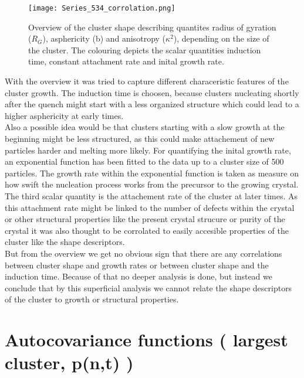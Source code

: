 \begin{figure}[!h]
\centering
\texttt{[image: Series\_534\_corrolation.png]}
\caption{Overview of the cluster shape describing quantites radius of gyration ($R_G$), asphericity (b) and anisotropy ($\kappa^2$), depending on the size of the cluster. The colouring depicts the scalar quantities induction time, constant attachment rate and inital growth rate.}
\label{fig:tog_overview}
\end{figure}

With the overview it was tried to capture different characeristic features of the cluster growth. The induction time is choosen, because clusters nucleating shortly after the quench might start with a  less organized structure which could lead to a higher asphericity at early times.\\ 

Also a possible idea would be that clusters starting with a slow growth at the beginning might be less structured, as this could make attachement of new particles harder and melting more likely. For quantifying the inital growth rate, an exponential function has been fitted to the data up to a cluster size of 500 particles. The growth rate within the exponential function is taken as measure on how swift the nucleation process works from the precursor to the growing crystal.\\

The third scalar quantity is the attachement rate of the cluster at later times. As this attachment rate might be linked to the number of defects within the crystal or other structural properties like the present crystal strucure or purity of the crystal it was also thought to be corrolated to easily accesible properties of the cluster like the shape descriptors.\\

But from the overview we get no obvious sign that there are any correlations between cluster shape and growth rates or between cluster shape and the induction time. Because of that no deeper analysis is done, but instead we conclude that by this superficial analysis we cannot relate the shape descriptors of the cluster to growth or structural properties.\\

\section{Autocovariance functions ( largest cluster, p(n,t) ) }
\label{sec:acf}

